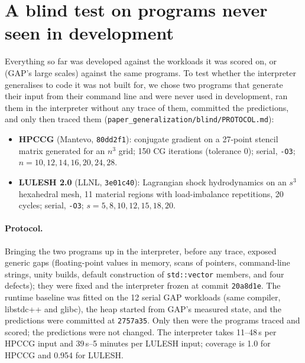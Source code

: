 \documentclass[11pt]{article}
\newcommand{\fittable}[1]{\sbox{\fitbox}{}%
  \ifdim\wd\fitbox>\linewidth\resizebox{\linewidth}{!}{\usebox{\fitbox}}\else\usebox{\fitbox}\fi}
\newcommand{\code}[1]{\texttt{#1}}
\newcommand{\tabref}[1]{Table~\ref{#1}}
\begin{document}
\begin{table}[!htbp]
\centering\small
\caption{C++ interpreter seconds per kernel and scale as frozen for the second blind test (u: uniform, K: Kronecker;
recorded with 4--16 runs at a time, so up to about twice the time of a run alone, \tabref{tab:costs-verify}).}
\label{tab:cost}
\fittable{tables/cost.tex}
\end{table}

\clearpage
\section{A blind test on programs never seen in development}
\label{sec:blind}

Everything so far was developed against the workloads it was scored on, or (GAP's large scales) against the same
programs. To test whether the interpreter generalises to code it was not built for, we chose two programs that
generate their input from their command line and were never used in development, ran them in the interpreter
without any trace of them, committed the predictions, and only then traced them
(\code{paper\_generalization/blind/PROTOCOL.md}):
\begin{itemize}
\item \textbf{HPCCG} (Mantevo, \code{80dd2f1}): conjugate gradient on a 27-point stencil matrix generated for an
$n^3$ grid; 150 CG iterations (tolerance 0); serial, \code{-O3}; $n = 10, 12, 14, 16, 20, 24, 28$.
\item \textbf{LULESH 2.0} (LLNL, \code{3e01c40}): Lagrangian shock hydrodynamics on an $s^3$ hexahedral mesh, 11
material regions with load-imbalance repetitions, 20 cycles; serial, \code{-O3}; $s = 5, 8, 10, 12, 15, 18, 20$.
\end{itemize}

\paragraph{Protocol.} Bringing the two programs up in the interpreter, before any trace, exposed generic gaps
(floating-point values in memory, scans of pointers, command-line strings, unity builds, default construction of
\code{std::vector} members, and four defects); they were fixed and the interpreter frozen at commit
\code{20a8d1e}. The runtime baseline was fitted on the 12 serial GAP workloads (same compiler, libstdc++ and glibc),
the heap started from GAP's measured state, and the predictions were committed at \code{2757a35}. Only then were the
programs traced and scored; the predictions were not changed. The interpreter takes 11--48\,s per HPCCG input and
39\,s--5 minutes per LULESH input; coverage is 1.0 for HPCCG and 0.954 for LULESH.
\end{document}
